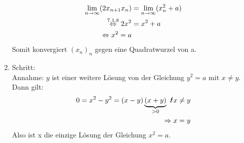 \documentclass[../ana1u.tex]{subfiles}
\begin{document}
\begin{bsp}
\begin{bew}
\begin{enumerate}
                \begin{align*}
                    \lim\limits_{n\rightarrow\infty} (2x_{n+1}x_n) &= \lim\limits_{n\rightarrow\infty} (x_n^2 + a)\\
                    \overset{\text{7.1.8}}{\Leftrightarrow} 2x^2 &= x^2 + a\\
                    \Leftrightarrow x^2 = a						
                \end{align*}
                Somit konvergiert \((x_n)_n\) gegen eine Quadratwurzel von a.
            \item Schritt:\\
                Annahme: \(y\) ist einer weitere Lösung von der Gleichung \(y^2 = a\) mit \(x \neq y\).\\
                Dann gilt:
                \begin{align*}
                    0 = x^2 - y^2 = (x-y)\underbrace{(x+y)}_{>0} \text{ \Lightning} x \neq y\\
                    \Rightarrow x = y
                \end{align*}
                Also ist x die einzige Lösung der Gleichung \(x^2 = a\).
        \end{enumerate}
    \end{bew}

\end{bsp}
\end{document}
